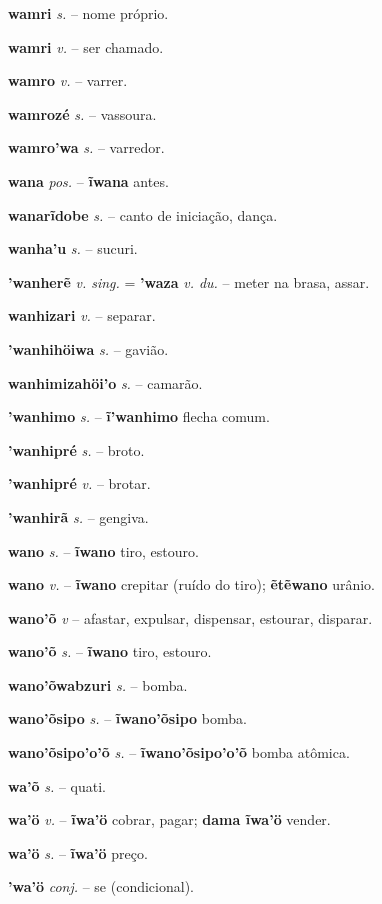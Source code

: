 \textbf{wamri} \textit{s.} -- nome próprio.

\textbf{wamri} \textit{v.} -- ser chamado.

\textbf{wamro} \textit{v.} -- varrer.

\textbf{wamrozé} \textit{s.} -- vassoura.

\textbf{wamro'wa} \textit{s.} -- varredor.

\textbf{wana} \textit{pos.} -- \textbf{ĩwana} antes.

\textbf{wanarĩdobe} \textit{s.} -- canto de iniciação, dança.

\textbf{wanha'u} \textit{s.} -- sucuri.

\textbf{'wanherẽ} \textit{v. sing.} = \textbf{'waza} \textit{v. du.} -- meter na brasa, assar.

\textbf{wanhizari} \textit{v.} -- separar.

\textbf{'wanhihöiwa} \textit{s.} -- gavião.

\textbf{wanhimizahöi'o} \textit{s.} -- camarão.

\textbf{'wanhimo} \textit{s.} -- \textbf{ĩ'wanhimo} flecha comum.

\textbf{'wanhipré} \textit{s.} -- broto.

\textbf{'wanhipré} \textit{v.} -- brotar.

\textbf{'wanhirã} \textit{s.} -- gengiva.

\textbf{wano} \textit{s.} -- \textbf{ĩwano} tiro, estouro.

\textbf{wano} \textit{v.} -- \textbf{ĩwano} crepitar (ruído do tiro); \textbf{ẽtẽwano} urânio.

\textbf{wano'õ} \textit{v} -- afastar, expulsar, dispensar, estourar, disparar.

\textbf{wano'õ} \textit{s.} -- \textbf{ĩwano} tiro, estouro.

\textbf{wano'õwabzuri} \textit{s.} -- bomba.

\textbf{wano'õsipo} \textit{s.} -- \textbf{ĩwano'õsipo} bomba.

\textbf{wano'õsipo'o'õ} \textit{s.} -- \textbf{ĩwano'õsipo'o'õ} bomba atômica.

\textbf{wa'õ} \textit{s.} -- quati.

\textbf{wa'ö} \textit{v.} -- \textbf{ĩwa'ö} cobrar, pagar; \textbf{dama ĩwa'ö} vender.

\textbf{wa'ö} \textit{s.} -- \textbf{ĩwa'ö} preço.

\textbf{'wa'ö} \textit{conj.} -- se (condicional).

